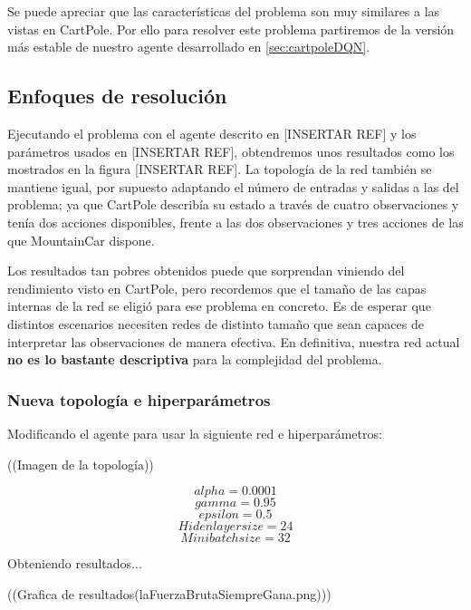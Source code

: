 Se puede apreciar que las características del problema son muy similares a las vistas en CartPole. Por ello para resolver este problema partiremos de la versión más estable de nuestro agente desarrollado en \ref{sec:cartpoleDQN}.


\subsection{Enfoques de resolución}

Ejecutando el problema con el agente descrito en [INSERTAR REF] y los parámetros usados en [INSERTAR REF], obtendremos unos resultados como los mostrados en la figura [INSERTAR REF]. La topología de la red también se mantiene igual, por supuesto adaptando el número de entradas y salidas a las del problema; ya que CartPole describía su estado a través de cuatro observaciones y tenía dos acciones disponibles, frente a las dos observaciones y tres acciones de las que MountainCar dispone.

Los resultados tan pobres obtenidos puede que sorprendan viniendo del rendimiento visto en CartPole, pero recordemos que el tamaño de las capas internas de la red se eligió para ese problema en concreto. Es de esperar que distintos escenarios necesiten redes de distinto tamaño que sean capaces de interpretar las observaciones de manera efectiva. En definitiva, nuestra red actual \textbf{no es lo bastante descriptiva} para la complejidad del problema.

\subsubsection*{Nueva topología e hiperparámetros}
Modificando el agente para usar la siguiente red e hiperparámetros:

((Imagen de la topología))

$$ alpha = 0.0001$$
$$ gamma = 0.95$$
$$ epsilon = 0.5$$
$$ Hiden layer size = 24$$
$$ Minibatch size = 32 $$

Obteniendo resultados... 

((Grafica de resultados(laFuerzaBrutaSiempreGana.png)))

